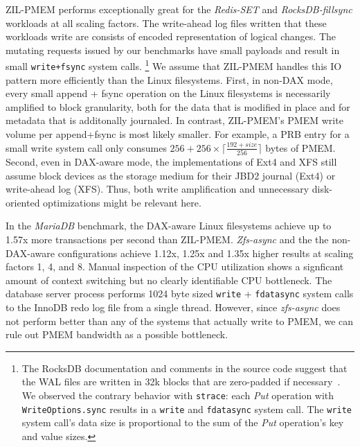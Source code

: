\documentclass[12pt,a4paper,twoside]{book}
\begin{document}
ZIL-PMEM performs exceptionally great for the \textit{Redis-SET} and \textit{RocksDB-fillsync} workloads at all scaling factors.
The write-ahead log files written that these workloads write are consists of encoded representation of logical changes.
The mutating requests issued by our benchmarks have small payloads and result in small \lstinline{write+fsync} system calls.%
\footnote{
    The RocksDB documentation and comments in the source code suggest that the WAL files are written in 32k blocks that are zero-padded if necessary~\cite[db/log\_writer.h]{RocksDBGitHubWikiWalPerformance}.
    We observed the contrary behavior with \lstinline{strace}: each \textit{Put} operation with \lstinline{WriteOptions.sync} results in a \lstinline{write} and \lstinline{fdatasync} system call. The \lstinline{write} system call's data size is proportional to the sum of the \textit{Put} operation's key and value sizes.
}
We assume that ZIL-PMEM handles this IO pattern more efficiently than the Linux filesystems.
First, in non-DAX mode, every small append + fsync operation on the Linux filesystems is necessarily amplified to block granularity, both for the data that is modified in place and for metadata that is additonally journaled.
In contrast, ZIL-PMEM's PMEM write volume per append+fsync is most likely smaller.
For example, a PRB entry for a small write system call only consumes $256 + 256 \times \lceil \frac{192 + size}{256} \rceil$ bytes of PMEM.
Second, even in DAX-aware mode, the implementations of Ext4 and XFS still assume block devices as the storage medium for their JBD2 journal (Ext4) or write-ahead log (XFS).
Thus, both write amplification and unnecessary disk-oriented optimizations might be relevant here.

In the \textit{MariaDB} benchmark, the DAX-aware Linux filesystems achieve up to 1.57x more transactions per second than ZIL-PMEM.
\textit{Zfs-async} and the the non-DAX-aware configurations achieve 1.12x, 1.25x and 1.35x higher results at scaling factors 1, 4, and 8.
Manual inspection of the CPU utilization shows a signficant amount of context switching but no clearly identifiable CPU bottleneck.
The database server process performs 1024 byte sized \lstinline{write} + \lstinline{fdatasync} system calls to the InnoDB redo log file from a single thread.
However, since \textit{zfs-async} does not perform better than any of the systems that actually write to PMEM, we can rule out PMEM bandwidth as a possible bottleneck.
\end{document}
